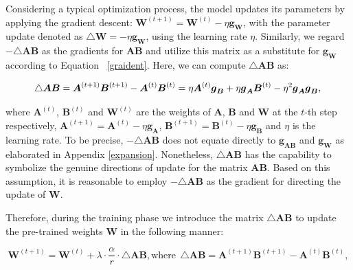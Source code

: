 {Considering a typical optimization process, the model updates its parameters by applying the gradient descent: $\boldsymbol{W}^{(t+1)} = \boldsymbol{W}^{(t)} - \eta {\boldsymbol{g}}_{\boldsymbol{W}}$, with the parameter update denoted as $\triangle \boldsymbol{W} = -\eta {\boldsymbol{g}}_{\boldsymbol{W}}$, using the learning rate $\eta$. 
Similarly, we regard $-\triangle \boldsymbol{A} \boldsymbol{B}$ as the gradients for $\boldsymbol{A}\boldsymbol{B}$ and utilize this matrix as a substitute for $\boldsymbol{g}_{\boldsymbol{W}}$ according to Equation ~\ref{graident}. Here, we can compute $\triangle \boldsymbol{A} \boldsymbol{B}$ as:

\begin{equation}
        \triangle \boldsymbol{A}\boldsymbol{B} = \boldsymbol{A}^{(t+1)}\boldsymbol{B}^{(t+1)} - \boldsymbol{A}^{(t)}\boldsymbol{B}^{(t)} 
        = \eta \boldsymbol{A}^{(t)} \boldsymbol{g}_{\boldsymbol{B}} + \eta \boldsymbol{g}_{\boldsymbol{A}}\boldsymbol{B}^{(t)} - \eta^{2} \boldsymbol{g}_{\boldsymbol{A}}\boldsymbol{g}_{\boldsymbol{B}}, \\
\end{equation}

where $\boldsymbol{A}^{(t)}$, $\boldsymbol{B}^{(t)}$ and $\boldsymbol{W}^{(t)}$ are the weights of $\boldsymbol{A}$, $\boldsymbol{B}$ and $\boldsymbol{W}$ at the $t$-th step respectively, $\boldsymbol{A}^{(t+1)} = \boldsymbol{A}^{(t)} - \eta \boldsymbol{g}_{\boldsymbol{A}}$, $\boldsymbol{B}^{(t+1)} = \boldsymbol{B}^{(t)} - \eta \boldsymbol{g}_{\boldsymbol{B}}$ and $\eta$ is the learning rate. To be precise, $-\triangle \boldsymbol{A} \boldsymbol{B}$ does not equate directly to $\boldsymbol{g}_{\boldsymbol{A} \boldsymbol{B}}$ and $\boldsymbol{g}_{\boldsymbol{W}}$ as elaborated in Appendix \ref{expansion}. Nonetheless, $\triangle \boldsymbol{A} \boldsymbol{B}$ has the capability to symbolize the genuine directions of update for the matrix $\boldsymbol{A}\boldsymbol{B}$. Based on this assumption, it is reasonable to employ $-\triangle\boldsymbol{A}\boldsymbol{B}$ as the gradient for directing the update of $\boldsymbol{W}$.

Therefore, during the training phase we introduce the matrix $\triangle \boldsymbol{A} \boldsymbol{B}$ to update the pre-trained weights $\boldsymbol{W}$ in the following manner:

\begin{equation}
\label{c_lora}
    \boldsymbol{W}^{(t+1)} = \boldsymbol{W}^{(t)} + \lambda \cdot \frac{\alpha}{r} \cdot \triangle \boldsymbol{A}\boldsymbol{B}, \text{where} \ \ \triangle \boldsymbol{A}\boldsymbol{B} = \boldsymbol{A}^{(t+1)}\boldsymbol{B}^{(t+1)} - \boldsymbol{A}^{(t)}\boldsymbol{B}^{(t)}, 
\end{equation}

}
